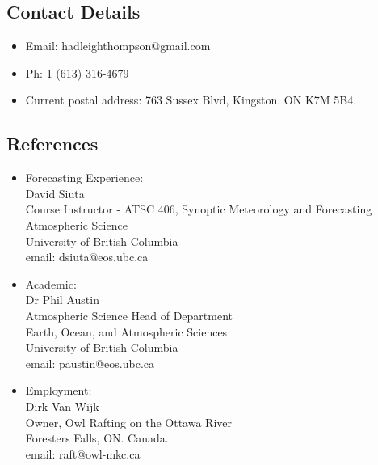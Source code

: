 \documentclass[]{article}
\begin{document}
\subsection*{Contact Details}
\begin{itemize}
\item Email: hadleighthompson@gmail.com
\item Ph: 1 (613) 316-4679
\item Current postal address: 763 Sussex Blvd, Kingston. ON K7M 5B4.
\end{itemize}

\subsection*{References}
\begin{itemize}
\item Forecasting Experience:\\
David Siuta \\
Course Instructor - ATSC 406, Synoptic Meteorology and Forecasting \\
Atmospheric Science \\
University of British Columbia\\
email: dsiuta@eos.ubc.ca
\item Academic: \\ 
Dr Phil Austin \\
Atmospheric Science Head of Department \\
Earth, Ocean, and Atmospheric Sciences \\
University of British Columbia \\
email: paustin@eos.ubc.ca
\item Employment: \\
Dirk Van Wijk \\
Owner, Owl Rafting on the Ottawa River \\
Foresters Falls, ON. Canada. \\
email: raft@owl-mkc.ca
\end{itemize}
\end{document}

